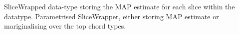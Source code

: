 \documentclass[12pt,a4paper,twoside,openany]{report} \usepackage[pdfborder={0 0 0}]{hyperref}    %
\theoremstyle{definition} \newtheorem{definition}{Definition}[section]
\begin{document}
    SliceWrapped data-type storing the MAP estimate for each slice within the datatype.
    Parametrised SliceWrapper, either storing MAP estimate or mariginalising over the top chord types.


%
%
%
%
%
%
\end{document}
